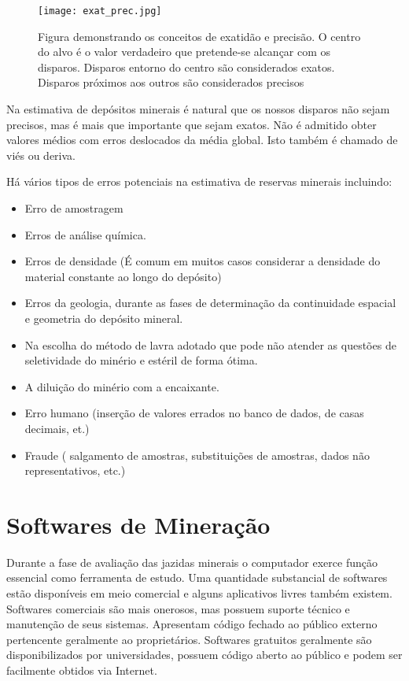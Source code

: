 \begin{figure}[H]
\centering
\texttt{[image: exat\_prec.jpg]}	
\caption{Figura demonstrando os conceitos de exatidão e precisão. O centro do alvo é o valor verdadeiro que pretende-se alcançar com os disparos. Disparos entorno do centro são considerados exatos. Disparos próximos aos outros são considerados precisos }
\label{exat_prec}
\end{figure}

Na estimativa de depósitos minerais é natural que os nossos disparos não sejam precisos, mas é mais que importante que sejam exatos. Não é admitido obter valores médios com erros deslocados da média global. Isto também é chamado de viés ou deriva. 

Há vários tipos de erros potenciais na estimativa de reservas minerais incluindo:

\begin{itemize}
\item Erro de amostragem 
\item Erros de análise química.
\item Erros de densidade (É comum em muitos casos considerar a densidade do material constante ao longo do depósito)
\item Erros da geologia, durante as fases de determinação da continuidade espacial e geometria do depósito mineral.
\item Na escolha do método de lavra adotado que pode não atender as questões de seletividade do minério e estéril de forma ótima.
\item A diluição do minério com a encaixante.
\item Erro humano (inserção de valores errados no banco de dados, de casas decimais, et.)
\item Fraude ( salgamento de amostras, substituições de amostras, dados não representativos, etc.)

\end{itemize}

\section{Softwares de Mineração}

Durante a fase de avaliação das jazidas minerais o computador exerce função essencial como ferramenta de estudo. Uma quantidade substancial de softwares estão disponíveis em meio comercial e alguns aplicativos livres também existem. Softwares comerciais são mais onerosos, mas possuem suporte técnico e manutenção de seus sistemas. Apresentam código fechado ao público externo pertencente geralmente ao proprietários. Softwares gratuitos geralmente são disponibilizados por universidades, possuem código aberto ao público e podem ser facilmente obtidos via Internet.  

